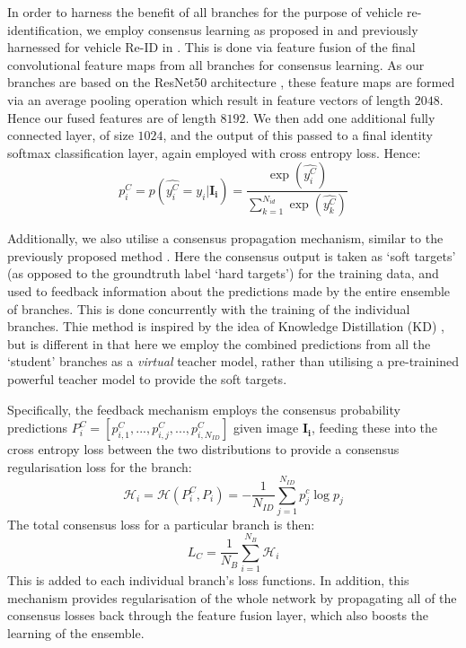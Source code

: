 \documentclass[10pt,twocolumn,letterpaper]{article}
\begin{document}
In order to harness the benefit of all branches for the purpose of vehicle re-identification, we employ consensus learning as proposed in \cite{chen2017person} and previously harnessed for vehicle Re-ID in \cite{kanaci2018vehicle}. This is done via feature fusion of the final convolutional feature maps from all branches for consensus learning. As our branches are based on the ResNet50 architecture \cite{he2016deep}, these feature maps are formed via an average pooling operation which result in feature vectors of length $2048$. Hence our fused features are of length $8192$. We then add one additional fully connected layer, of size $1024$, and the output of this passed to a final identity softmax classification layer, again employed with cross entropy loss. Hence:
\begin{equation}
  p_i^C = p(\hat{y_i^C} = y_i|\mathbf{I_i}) = \frac{\exp(\hat{y_i^C})}{\sum_{k=1}^{N_{id}}\exp(\hat{y_k^C})}
\end{equation}

Additionally, we also utilise a consensus propagation mechanism, similar to the previously proposed method \cite{chen2017person,kanaci2018vehicle}. Here the consensus output is taken as `soft targets' (as opposed to the groundtruth label `hard targets') for the training data, and used to feedback information about the predictions made by the entire ensemble of branches. This is done concurrently with the training of the individual branches. Thie method is inspired by the idea of Knowledge Distillation (KD) \cite{hinton2015distilling}, but is different in that here we employ the combined predictions from all the `student' branches as a \emph{virtual} teacher model, rather than utilising a pre-trainined powerful teacher model to provide the soft targets.

Specifically, the feedback mechanism employs the consensus probability predictions $P^C_i = \left[p_{i,1}^C,...,p_{i,j}^C,...,p_{i,N_{ID}}^C\right]$ given image $\mathbf{I_i}$, feeding these into the cross entropy loss between the two distributions to provide a consensus regularisation loss for the branch:
\begin{equation}
  \mathcal{H}_i = \mathcal{H}(P^C_i, P_i) = -\frac{1}{N_{ID}}\sum_{j=1}^{N_{ID}} p_j^c \log{p_j}
\end{equation}
The total consensus loss for a particular branch is then:
\begin{equation}
  L_{C} = \frac{1}{N_B} \sum_{i=1}^{N_B} \mathcal{H}_i
\end{equation}
This is added to each individual branch's loss functions. In addition, this mechanism provides regularisation of the whole network by propagating all of the consensus losses back through the feature fusion layer, which also boosts the learning of the ensemble.
\end{document}
